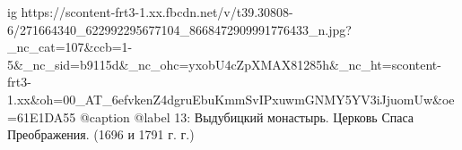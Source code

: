  
 
 
 
 

\ifcmt
  ig https://scontent-frt3-1.xx.fbcdn.net/v/t39.30808-6/271664340_622992295677104_8668472909991776433_n.jpg?_nc_cat=107&ccb=1-5&_nc_sid=b9115d&_nc_ohc=yxobU4cZpXMAX81285h&_nc_ht=scontent-frt3-1.xx&oh=00_AT_6efvkenZ4dgruEbuKmmSvIPxuwmGNMY5YV3iJjuomUw&oe=61E1DA55
  @caption @label 13: Выдубицкий монастырь. Церковь Спаса Преображения. (1696 и 1791 г. г.)
\fi
